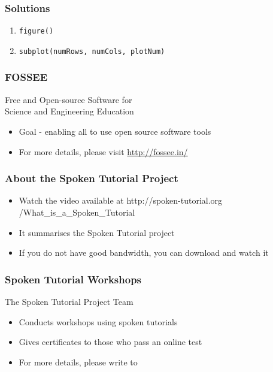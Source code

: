 \documentclass[17pt,compress]{beamer}
\begin{document}
\begin{frame}
\frametitle{Solutions}
\label{sec-9}
\begin{enumerate}
\item \texttt{figure()}\pause
\item \texttt{subplot(numRows, numCols, plotNum)}
\end{enumerate}
\end{frame}
\begin{frame}
\frametitle{FOSSEE}
{\color{blue}Free and Open-source Software for \\Science and Engineering Education} \\
\begin{itemize}
\item Goal - enabling all to use open source software tools
\item For more details, please visit {\color{blue}\url{http://fossee.in/}}
\end{itemize}
\end{frame}
\begin{frame}
\frametitle{About the Spoken Tutorial Project}
\begin{itemize}
\item Watch the video available at {\color{blue}http://spoken-tutorial.org /What\_is\_a\_Spoken\_Tutorial}
\item It summarises the Spoken Tutorial project \pause
\item If you do not have good bandwidth, you can download and watch it
\end{itemize}
\end{frame}
\begin{frame}
\frametitle{Spoken Tutorial Workshops}The Spoken Tutorial Project Team 
\begin{itemize}
\item Conducts workshops using spoken tutorials 
\item Gives certificates to those who pass an online test 
\item For more details, please write to \\ 
\end{itemize}
\end{frame}
\end{document}

